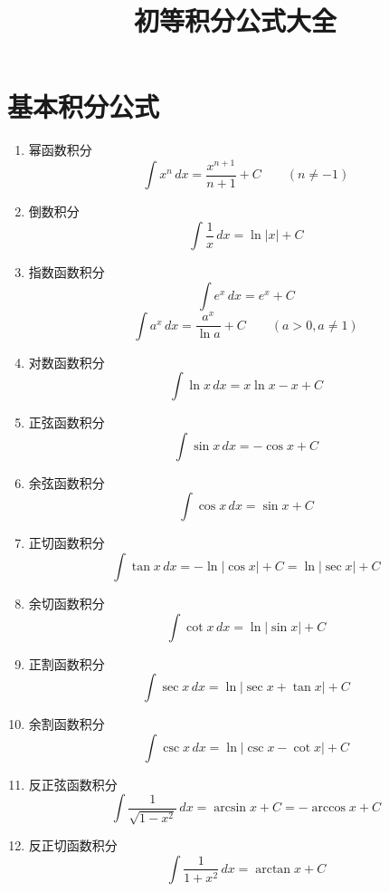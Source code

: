 \documentclass{article}
\begin{document}
\title{初等积分公式大全}
\author{}
\date{}
\maketitle

\section*{基本积分公式}

\begin{enumerate}
    \item 幂函数积分
    \[
    \int x^n \, dx = \frac{x^{n+1}}{n+1} + C \qquad (n \neq -1)
    \]
    
    \item 倒数积分
    \[
    \int \frac{1}{x} \, dx = \ln |x| + C
    \]
    
    \item 指数函数积分
    \[
    \int e^x \, dx = e^x + C
    \]
    \[
    \int a^x \, dx = \frac{a^x}{\ln a} + C \qquad (a > 0, a \neq 1)
    \]
    
    \item 对数函数积分
    \[
    \int \ln x \, dx = x \ln x - x + C
    \]
    
    \item 正弦函数积分
    \[
    \int \sin x \, dx = -\cos x + C
    \]
    
    \item 余弦函数积分
    \[
    \int \cos x \, dx = \sin x + C
    \]
    
    \item 正切函数积分
    \[
    \int \tan x \, dx = -\ln |\cos x| + C = \ln |\sec x| + C
    \]
    
    \item 余切函数积分
    \[
    \int \cot x \, dx = \ln |\sin x| + C
    \]
    
    \item 正割函数积分
    \[
    \int \sec x \, dx = \ln |\sec x + \tan x| + C
    \]
    
    \item 余割函数积分
    \[
    \int \csc x \, dx = \ln |\csc x - \cot x| + C
    \]
    
    \item 反正弦函数积分
    \[
    \int \frac{1}{\sqrt{1-x^2}} \, dx = \arcsin x + C = -\arccos x + C
    \]
    
    \item 反正切函数积分
    \[
    \int \frac{1}{1+x^2} \, dx = \arctan x + C
    \]
\end{enumerate}
\end{document}
